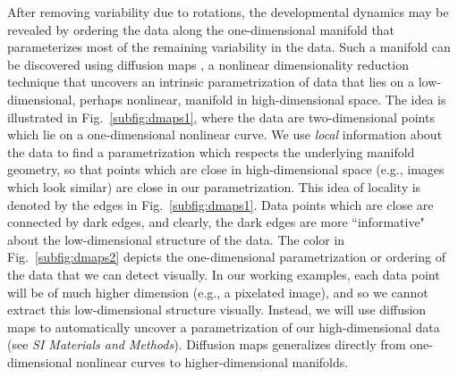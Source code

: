 \documentclass{pnastwo}
\newcommand{\SI}[0]{{\it SI Materials and Methods}}
\newcommand{\fig}[0]{Fig.}
\begin{document}
\begin{article}
After removing variability due to rotations, the developmental dynamics may be revealed by ordering the data along the one-dimensional manifold that parameterizes most of the remaining variability in the data.
%
Such a manifold can be discovered using diffusion maps \cite{coifman2005geometric}, a nonlinear dimensionality reduction technique that uncovers an intrinsic parametrization of data that lies on a low-dimensional, perhaps nonlinear, manifold in high-dimensional space.
%
The idea is illustrated in \fig~\ref{subfig:dmaps1}, where the data are two-dimensional points which lie on a one-dimensional nonlinear curve.
%
We use {\it local} information about the data to find a parametrization  which respects the underlying manifold geometry, so that points which are close in high-dimensional space (e.g., images which look similar) are close in our parametrization.
%
This idea of locality is denoted by the edges in \fig~\ref{subfig:dmaps1}.
%
Data points which are close are connected by dark edges, and clearly, the dark edges are more ``informative" about the low-dimensional structure of the data.
%
The color in \fig~\ref{subfig:dmaps2} depicts the one-dimensional parametrization or ordering of the data that we can detect visually.
%
In our working examples, each data point will be of much higher dimension (e.g., a pixelated image), and so we cannot extract this low-dimensional structure visually.
%
Instead, we will use diffusion maps to automatically uncover a parametrization of our high-dimensional data (see \SI).
%
Diffusion maps generalizes directly from one-dimensional nonlinear curves to higher-dimensional manifolds.


\end{article}
\end{document}
